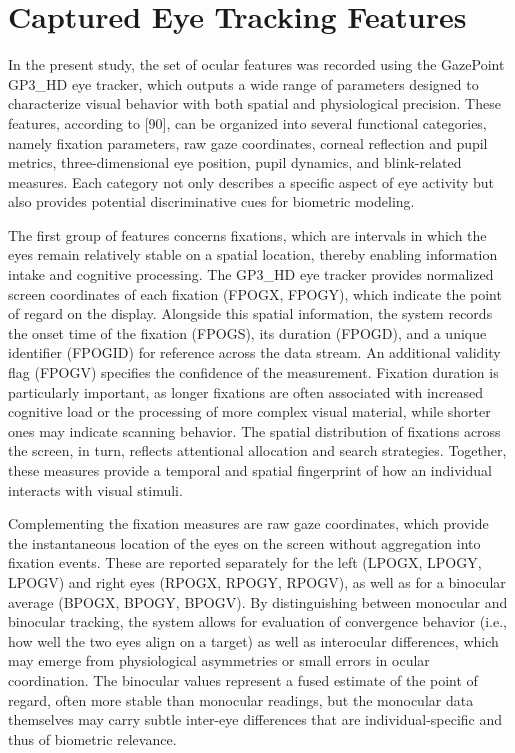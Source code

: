 \documentclass[12pt]{report}
\begin{document}
\section{Captured Eye Tracking Features}

In the present study, the set of ocular features was recorded using the GazePoint GP3\_HD eye tracker, which outputs a wide range of parameters designed to characterize visual behavior with both spatial and physiological precision. 
These features, according to [90], can be organized into several functional categories, namely fixation parameters, raw gaze coordinates, corneal reflection and pupil metrics, three-dimensional eye position, pupil dynamics, and blink-related measures. 
Each category not only describes a specific aspect of eye activity but also provides potential discriminative cues for biometric modeling.

The first group of features concerns fixations, which are intervals in which the eyes remain relatively stable on a spatial location, thereby enabling information intake and cognitive processing. 
The GP3\_HD eye tracker provides normalized screen coordinates of each fixation (FPOGX, FPOGY), which indicate the point of regard on the display. 
Alongside this spatial information, the system records the onset time of the fixation (FPOGS), its duration (FPOGD), and a unique identifier (FPOGID) for reference across the data stream. 
An additional validity flag (FPOGV) specifies the confidence of the measurement. 
Fixation duration is particularly important, as longer fixations are often associated with increased cognitive load or the processing of more complex visual material, while shorter ones may indicate scanning behavior. 
The spatial distribution of fixations across the screen, in turn, reflects attentional allocation and search strategies. 
Together, these measures provide a temporal and spatial fingerprint of how an individual interacts with visual stimuli.

Complementing the fixation measures are raw gaze coordinates, which provide the instantaneous location of the eyes on the screen without aggregation into fixation events. 
These are reported separately for the left (LPOGX, LPOGY, LPOGV) and right eyes (RPOGX, RPOGY, RPOGV), as well as for a binocular average (BPOGX, BPOGY, BPOGV). 
By distinguishing between monocular and binocular tracking, the system allows for evaluation of convergence behavior (i.e., how well the two eyes align on a target) as well as interocular differences, which may emerge from physiological asymmetries or small errors in ocular coordination. 
The binocular values represent a fused estimate of the point of regard, often more stable than monocular readings, but the monocular data themselves may carry subtle inter-eye differences that are individual-specific and thus of biometric relevance.
\end{document}
